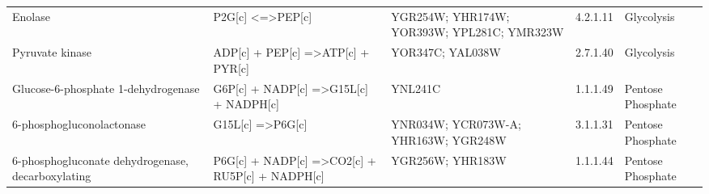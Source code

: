 \begin{table}[H]
\begin{center}
{\begin{tabular}{p{11cm}p{17cm}p{8cm}lp{5cm}}
Enolase                                                                                   & P2G{[}c{]} \textless{}=\textgreater PEP{[}c{]}                                                                                                  & YGR254W; YHR174W; YOR393W; YPL281C; YMR323W                                                                                                                      & 4.2.1.11           & Glycolysis                                                                  \\
Pyruvate kinase                                                                           & ADP{[}c{]} + PEP{[}c{]} =\textgreater ATP{[}c{]} + PYR{[}c{]}                                                                                   & YOR347C; YAL038W                                                                                                                                                 & 2.7.1.40           & Glycolysis                                                                  \\
Glucose-6-phosphate 1-dehydrogenase                                                       & G6P{[}c{]} + NADP{[}c{]} =\textgreater G15L{[}c{]} + NADPH{[}c{]}                                                                               & YNL241C                                                                                                                                                          & 1.1.1.49           & Pentose Phosphate                                                           \\
6-phosphogluconolactonase                                                                 & G15L{[}c{]} =\textgreater P6G{[}c{]}                                                                                                            & YNR034W; YCR073W-A; YHR163W; YGR248W                                                                                                                             & 3.1.1.31           & Pentose Phosphate                                                           \\
6-phosphogluconate dehydrogenase, decarboxylating                                         & P6G{[}c{]} + NADP{[}c{]} =\textgreater CO2{[}c{]} + RU5P{[}c{]} + NADPH{[}c{]}                                                                  & YGR256W; YHR183W                                                                                                                                                 & 1.1.1.44           & Pentose Phosphate                                                           \\

\end{tabular}}
\end{center}
\end{table}
